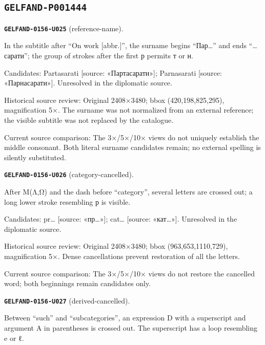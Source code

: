 \subsection*{\texttt{GELFAND-P001444}}
\par\noindent\leavevmode{}\label{GELFAND-0156-U025}\label{GELFAND-P001444:reference-name}\textbf{\texttt{GELFAND-0156-U025}} (reference-name).\nopagebreak[4]\par
In the subtitle after “On work [abbr.]”, the surname begins “Пар…” and ends “…сарати”; the group of strokes after the first р permits т or н.\par
Candidates: Partasarati [source: «Партасарати»]; Parnasarati [source: «Парнасарати»]. Unresolved in the diplomatic source.\par
Historical source review: Original 2408×3480; bbox (420,198,825,295), magnification 5×. The surname was not normalized from an external reference; the visible subtitle was not replaced by the catalogue.\par
Current source comparison: The 3×/5×/10× views do not uniquely establish the middle consonant. Both literal surname candidates remain; no external spelling is silently substituted.\par\medskip
\par\noindent\leavevmode{}\label{GELFAND-0156-U026}\label{GELFAND-P001444:category-cancelled}\textbf{\texttt{GELFAND-0156-U026}} (category-cancelled).\nopagebreak[4]\par
After M(Λ,Ω) and the dash before “category”, several letters are crossed out; a long lower stroke resembling р is visible.\par
Candidates: pr… [source: «пр…»]; cat… [source: «кат…»]. Unresolved in the diplomatic source.\par
Historical source review: Original 2408×3480; bbox (963,653,1110,729), magnification 5×. Dense cancellations prevent restoration of all the letters.\par
Current source comparison: The 3×/5×/10× views do not restore the cancelled word; both beginnings remain candidates only.\par\medskip
\par\noindent\leavevmode{}\label{GELFAND-0156-U027}\label{GELFAND-P001444:derived-cancelled}\textbf{\texttt{GELFAND-0156-U027}} (derived-cancelled).\nopagebreak[4]\par
Between “such” and “subcategories”, an expression D with a superscript and argument A in parentheses is crossed out. The superscript has a loop resembling e or ℓ.\par
